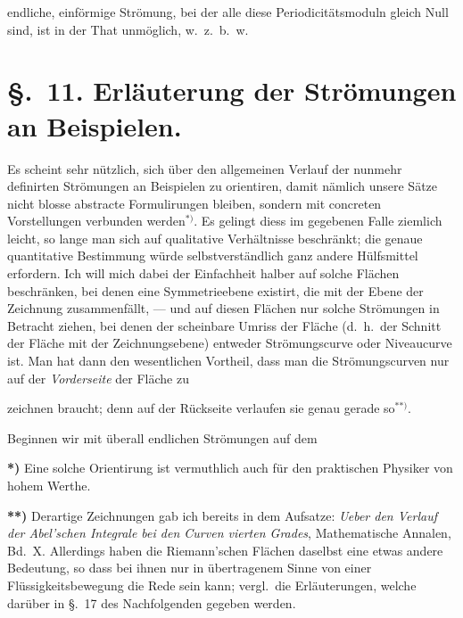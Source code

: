 \documentclass{article}
\begin{document}
endliche, einförmige Strömung, bei der alle diese Periodicitätsmoduln gleich Null sind, ist in der That unmöglich, w.\ z.\ b.\ w.

\section*{§.~11. Erläuterung der Strömungen an Beispielen.}

Es scheint sehr nützlich, sich über den allgemeinen Verlauf der nunmehr definirten Strömungen an Beispielen zu orientiren, damit nämlich unsere Sätze nicht blosse abstracte Formulirungen bleiben, sondern mit concreten Vorstellungen verbunden werden${}^{*)}$. Es gelingt diess im gegebenen Falle ziemlich leicht, so lange man sich auf qualitative Verhältnisse beschränkt; die genaue quantitative Bestimmung würde selbstverständlich ganz andere Hülfsmittel erfordern. Ich will mich dabei der Einfachheit halber auf solche Flächen beschränken, bei denen eine Symmetrieebene existirt, die mit der Ebene der Zeichnung zusammenfällt, --- und auf diesen Flächen nur solche Strömungen in Betracht ziehen, bei denen der scheinbare Umriss der Fläche (d.\ h.\ der Schnitt der Fläche mit der Zeichnungsebene) entweder Strömungscurve oder Niveaucurve ist. Man hat dann den wesentlichen Vortheil, dass man die Strömungscurven nur auf der \emph{Vorderseite} der Fläche zu


zeichnen braucht; denn auf der Rückseite verlaufen sie genau gerade so${}^{**)}$.

Beginnen wir mit überall endlichen Strömungen auf dem

\textbf{*)} Eine solche Orientirung ist vermuthlich auch für den praktischen Physiker von hohem Werthe.

\textbf{**)} Derartige Zeichnungen gab ich bereits in dem Aufsatze: \emph{Ueber den Verlauf der Abel'schen Integrale bei den Curven vierten Grades}, Mathematische Annalen, Bd.~X. Allerdings haben die Riemann'schen Flächen daselbst eine etwas andere Bedeutung, so dass bei ihnen nur in übertragenem Sinne von einer Flüssigkeitsbewegung die Rede sein kann; vergl.\ die Erläuterungen, welche darüber in §.~17 des Nachfolgenden gegeben werden.
\end{document}

